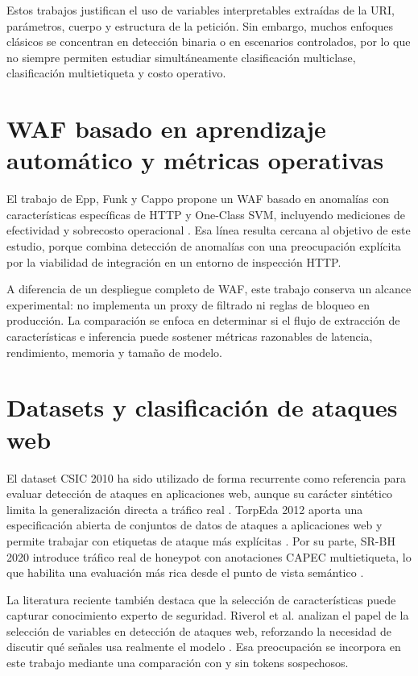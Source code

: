 \documentclass[12pt,oneside]{report}
\begin{document}
Estos trabajos justifican el uso de variables interpretables extraídas de la URI, parámetros, cuerpo y estructura de la petición. Sin embargo, muchos enfoques clásicos se concentran en detección binaria o en escenarios controlados, por lo que no siempre permiten estudiar simultáneamente clasificación multiclase, clasificación multietiqueta y costo operativo.

\section{WAF basado en aprendizaje automático y métricas operativas}
El trabajo de Epp, Funk y Cappo propone un WAF basado en anomalías con características específicas de HTTP y One-Class SVM, incluyendo mediciones de efectividad y sobrecosto operacional \cite{ocswaf_zenodo}. Esa línea resulta cercana al objetivo de este estudio, porque combina detección de anomalías con una preocupación explícita por la viabilidad de integración en un entorno de inspección HTTP.

A diferencia de un despliegue completo de WAF, este trabajo conserva un alcance experimental: no implementa un proxy de filtrado ni reglas de bloqueo en producción. La comparación se enfoca en determinar si el flujo de extracción de características e inferencia puede sostener métricas razonables de latencia, rendimiento, memoria y tamaño de modelo.

\section{Datasets y clasificación de ataques web}
El dataset CSIC 2010 ha sido utilizado de forma recurrente como referencia para evaluar detección de ataques en aplicaciones web, aunque su carácter sintético limita la generalización directa a tráfico real \cite{csic2010_impact,csic2010_doc}. TorpEda 2012 aporta una especificación abierta de conjuntos de datos de ataques a aplicaciones web y permite trabajar con etiquetas de ataque más explícitas \cite{torpeda_2012}. Por su parte, SR-BH 2020 introduce tráfico real de honeypot con anotaciones CAPEC multietiqueta, lo que habilita una evaluación más rica desde el punto de vista semántico \cite{srbh_dataverse,srbh_paper}.

La literatura reciente también destaca que la selección de características puede capturar conocimiento experto de seguridad. Riverol et al. analizan el papel de la selección de variables en detección de ataques web, reforzando la necesidad de discutir qué señales usa realmente el modelo \cite{riverol_2024}. Esa preocupación se incorpora en este trabajo mediante una comparación con y sin tokens sospechosos.
\end{document}
